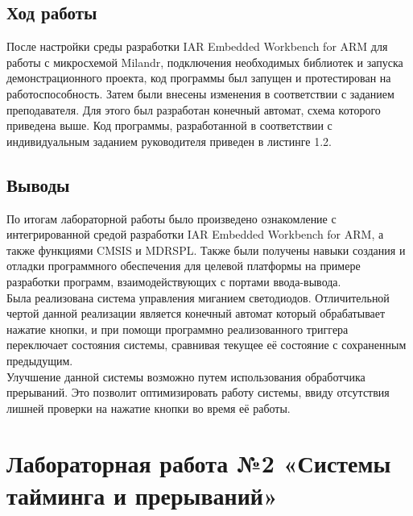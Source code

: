 \documentclass[14pt,a4paper,report]{report}
\begin{document}
\section{Ход работы}

После настройки среды разработки IAR Embedded Workbench for ARM для работы с микросхемой Milandr, подключения необходимых библиотек и запуска демонстрационного проекта, код программы был запущен и протестирован на работоспособность. Затем были внесены изменения в соответствии с заданием преподавателя. Для этого был разработан конечный автомат, схема которого приведена выше. 
Код программы, разработанной в соответствии с индивидуальным заданием руководителя приведен в листинге 1.2. 




\section{Выводы}
По итогам лабораторной работы было произведено ознакомление с интегрированной средой разработки IAR Embedded Workbench for ARM, а также функциями CMSIS и MDRSPL. Также были получены навыки создания и отладки программного обеспечения для целевой платформы на примере разработки программ, взаимодействующих с портами ввода-вывода. \\
\indent Была реализована система управления миганием светодиодов. Отличительной чертой данной реализации является конечный автомат который обрабатывает нажатие кнопки, и при помощи программно реализованного триггера переключает состояния системы, сравнивая текущее её состояние с сохраненным предыдущим. \\
\indent Улучшение данной системы возможно путем использования обработчика прерываний. Это позволит оптимизировать работу системы, ввиду отсутствия лишней проверки на нажатие кнопки во время её работы.

\clearpage

\chapter {Лабораторная работа №2 «Системы тайминга и прерываний»}
\end{document}
